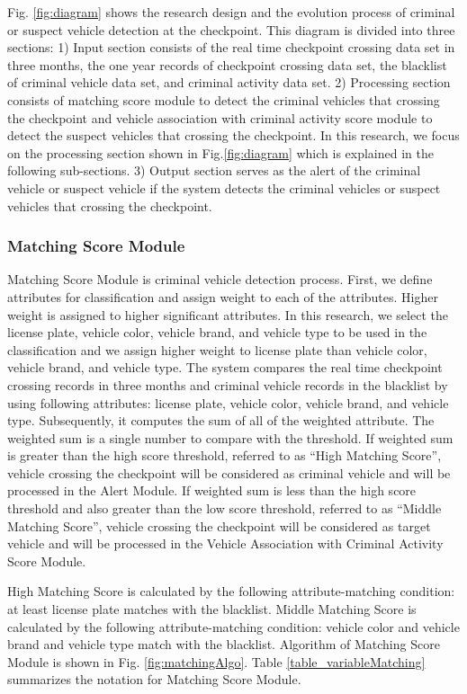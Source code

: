 Fig. \ref{fig:diagram} shows the research design and the evolution process of criminal or suspect vehicle detection at the checkpoint. This diagram is divided into three sections: 
1) Input section consists of the real time checkpoint crossing data set in three months, the one year records of checkpoint crossing data set, the blacklist of criminal vehicle data set, and criminal activity data set. 
2) Processing section consists of matching score module to detect the criminal vehicles that crossing the checkpoint and vehicle association with criminal activity score module to detect the suspect vehicles that crossing the checkpoint. In this research, we focus on the processing section shown in Fig.\ref{fig:diagram} which is explained in the following sub-sections. 
3) Output section serves as the alert of the criminal vehicle or suspect vehicle if the system detects the criminal vehicles or suspect vehicles that crossing the checkpoint. 

\subsubsection{Matching Score Module}
Matching Score Module is criminal vehicle detection process. 
First, we define attributes for classification and assign weight to each of the attributes. 
Higher weight is assigned to higher significant attributes.
In this research, we select the license plate, vehicle color, vehicle brand, and vehicle type to be used in the classification and we assign higher weight to license plate than vehicle color, vehicle brand, and vehicle type. 
The system compares the real time checkpoint crossing records in three months and criminal vehicle records in the blacklist by using following attributes: license plate, vehicle color, vehicle brand, and vehicle type. 
Subsequently, it computes the sum of all of the weighted attribute. 
The weighted sum is a single number to compare with the threshold.  
If weighted sum is greater than the high score threshold, referred to as “High Matching Score”, vehicle crossing the checkpoint will be considered as criminal vehicle and will be processed in the Alert Module. 
If weighted sum is less than the high score threshold and also greater than the low score threshold, referred to as “Middle Matching Score”, vehicle crossing the checkpoint will be considered as target vehicle and will be processed in the Vehicle Association with Criminal Activity Score Module. 

High Matching Score is calculated by the following attribute-matching condition: at least license plate matches with the blacklist.
Middle Matching Score is calculated by the following attribute-matching condition: vehicle color and vehicle brand and vehicle type match with the blacklist. 
Algorithm of Matching Score Module is shown in Fig. \ref{fig:matchingAlgo}. Table \ref{table_variableMatching} summarizes the notation for Matching Score Module.

